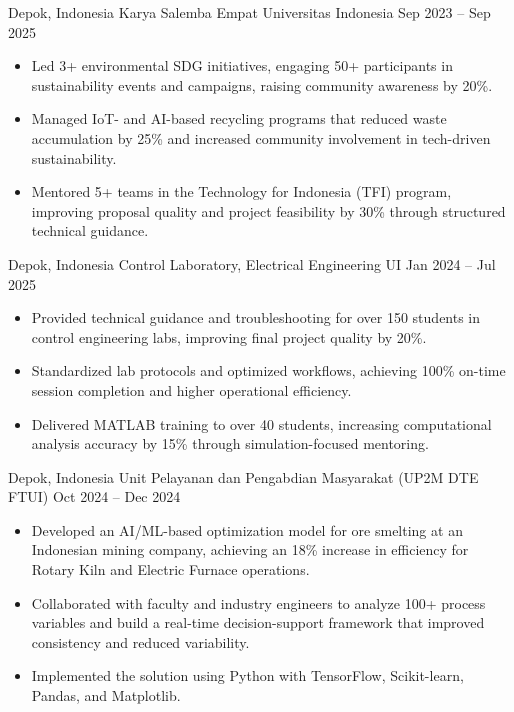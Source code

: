 {Depok, Indonesia}
{Karya Salemba Empat Universitas Indonesia}
{Sep 2023 -- Sep 2025}
{
\begin{itemize}
    \itemsep0em
    \item Led 3+ environmental SDG initiatives, engaging 50+ participants in sustainability events and campaigns, raising community awareness by 20\%.
    \item Managed IoT- and AI-based recycling programs that reduced waste accumulation by 25\% and increased community involvement in tech-driven sustainability.
    \item Mentored 5+ teams in the Technology for Indonesia (TFI) program, improving proposal quality and project feasibility by 30\% through structured technical guidance.
\end{itemize}
}

{Depok, Indonesia}
{Control Laboratory, Electrical Engineering UI}
{Jan 2024 -- Jul 2025}
{
\begin{itemize}
    \itemsep0em
    \item Provided technical guidance and troubleshooting for over 150 students in control engineering labs, improving final project quality by 20\%.
    \item Standardized lab protocols and optimized workflows, achieving 100\% on-time session completion and higher operational efficiency.
    \item Delivered MATLAB training to over 40 students, increasing computational analysis accuracy by 15\% through simulation-focused mentoring.
\end{itemize}
}

{Depok, Indonesia}
{Unit Pelayanan dan Pengabdian Masyarakat (UP2M DTE FTUI)}
{Oct 2024 -- Dec 2024}
{
\begin{itemize}
    \itemsep0em
    \item Developed an AI/ML-based optimization model for ore smelting at an Indonesian mining company, achieving an 18\% increase in efficiency for Rotary Kiln and Electric Furnace operations.
    \item Collaborated with faculty and industry engineers to analyze 100+ process variables and build a real-time decision-support framework that improved consistency and reduced variability.
    \item Implemented the solution using Python with TensorFlow, Scikit-learn, Pandas, and Matplotlib.
\end{itemize}
}

